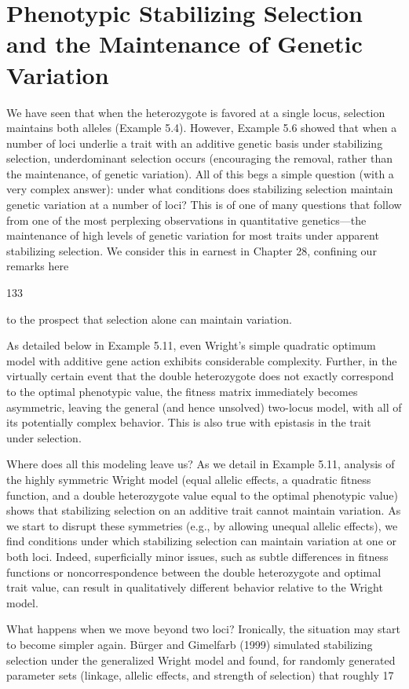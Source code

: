 \documentclass{article}
\begin{document}
\section{Phenotypic Stabilizing Selection and the Maintenance of Genetic Variation}
We have seen that when the heterozygote is favored at a single locus, selection maintains both alleles (Example 5.4). However, Example 5.6 showed that when a number of loci underlie a trait with an additive genetic basis under stabilizing selection, underdominant selection occurs (encouraging the removal, rather than the maintenance, of genetic variation). All of this begs a simple question (with a very complex answer): under what conditions does stabilizing selection maintain genetic variation at a number of loci? This is of one of many questions that follow from one of the most perplexing observations in quantitative genetics—the maintenance of high levels of genetic variation for most traits under apparent stabilizing selection. We consider this in earnest in Chapter 28, confining our remarks here

133

to the prospect that selection alone can maintain variation.

As detailed below in Example 5.11, even Wright's simple quadratic optimum model with additive gene action exhibits considerable complexity. Further, in the virtually certain event that the double heterozygote does not exactly correspond to the optimal phenotypic value, the fitness matrix immediately becomes asymmetric, leaving the general (and hence unsolved) two-locus model, with all of its potentially complex behavior. This is also true with epistasis in the trait under selection.

Where does all this modeling leave us? As we detail in Example 5.11, analysis of the highly symmetric Wright model (equal allelic effects, a quadratic fitness function, and a double heterozygote value equal to the optimal phenotypic value) shows that stabilizing selection on an additive trait cannot maintain variation. As we start to disrupt these symmetries (e.g., by allowing unequal allelic effects), we find conditions under which stabilizing selection can maintain variation at one or both loci. Indeed, superficially minor issues, such as subtle differences in fitness functions or noncorrespondence between the double heterozygote and optimal trait value, can result in qualitatively different behavior relative to the Wright model.

What happens when we move beyond two loci? Ironically, the situation may start to become simpler again. Bürger and Gimelfarb (1999) simulated stabilizing selection under the generalized Wright model and found, for randomly generated parameter sets (linkage, allelic effects, and strength of selection) that roughly 17%
\end{document}

